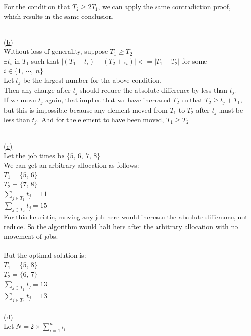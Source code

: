 \documentclass[12pt]{article}
\begin{document}
	For the condition that $T_2 \geq 2T_1$, we can apply the same contradiction proof,
	which results in the same conclusion.

	~\\\hyperlink{toc}{\hypertarget{2.2}{(b)}}\\
	Without loss of generality, suppose $T_1 \geq T_2$\\

$\exists t_i$ in $T_1$ such that $\big|(T_1 - t_i) - (T_2 + t_i)\big| <= |T_1 - T_2|$ for some $i \in \{1,\ \cdots,\ n\}$\\

	Let $t_j$ be the largest number for the above condition. \\
	Then any change after $t_j$ should reduce the absolute difference by less than $t_j$. \\
	If we move $t_j$ again, that implies that we have increased $T_2$ so that $T_2 \geq t_j + T_1$, but this is impossible because
	any element moved from $T_1$ to $T_2$ after $t_j$ must be less than $t_j$. And for the element to have been moved, $T_1 \geq T_2$

	~\\\hyperlink{toc}{\hypertarget{2.3}{(c)}}\\
	Let the job times be $\{5,\ 6,\ 7,\ 8\}$\\
	We can get an arbitrary allocation as follows:\\
$T_1 = \{5,\ 6\}$\\
$T_2 = \{7,\ 8\}$\\

$\sum\limits_{j\in T_1} t_j = 11$\\
$\sum\limits_{j\in T_2} t_j = 15$\\
	For this heuristic, moving any job here would increase the absolute difference, not reduce.
	So the algorithm would halt here after the arbitrary allocation with no movement of jobs.\\\\

	But the optimal solution is:\\
$T_1 = \{5,\ 8\}$\\
$T_2 = \{6,\ 7\}$\\

$\sum\limits_{j\in T_1} t_j = 13$\\
$\sum\limits_{j\in T_2} t_j = 13$\\

	\newpage
	~\\\hyperlink{toc}{\hypertarget{2.4}{(d)}}\\
	Let $N = 2 \times \sum\limits_{i = 1}^{n}t_i$\\
\end{document}
